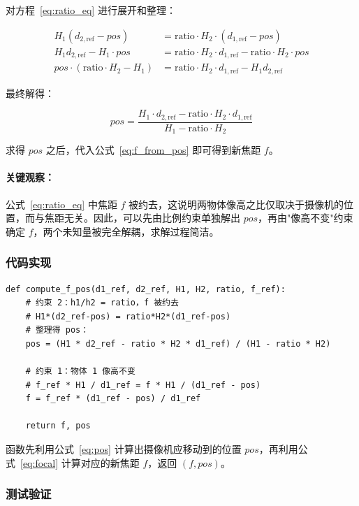 \documentclass[12pt,a4paper]{ctexart}
\begin{document}
对方程~\eqref{eq:ratio_eq} 进行展开和整理：

\begin{align}
  H_1 (d_{2,\text{ref}} - pos) &= \text{ratio} \cdot H_2 \cdot (d_{1,\text{ref}} - pos) \\
  H_1 d_{2,\text{ref}} - H_1 \cdot pos &= \text{ratio} \cdot H_2 \cdot d_{1,\text{ref}} - \text{ratio} \cdot H_2 \cdot pos \\
  pos \cdot (\text{ratio} \cdot H_2 - H_1) &= \text{ratio} \cdot H_2 \cdot d_{1,\text{ref}} - H_1 d_{2,\text{ref}}
\end{align}

最终解得：

\begin{equation}
  \boxed{pos = \frac{H_1 \cdot d_{2,\text{ref}} - \text{ratio} \cdot H_2 \cdot d_{1,\text{ref}}}{H_1 - \text{ratio} \cdot H_2}}
  \label{eq:pos}
\end{equation}

求得 $pos$ 之后，代入公式~\eqref{eq:f_from_pos} 即可得到新焦距 $f$。

\paragraph{关键观察：}公式~\eqref{eq:ratio_eq} 中焦距 $f$ 被约去，这说明两物体像高之比仅取决于摄像机的位置，而与焦距无关。因此，可以先由比例约束单独解出 $pos$，再由"像高不变"约束确定 $f$，两个未知量被完全解耦，求解过程简洁。

\subsubsection{代码实现}

\begin{lstlisting}
def compute_f_pos(d1_ref, d2_ref, H1, H2, ratio, f_ref):
    # 约束 2：h1/h2 = ratio，f 被约去
    # H1*(d2_ref-pos) = ratio*H2*(d1_ref-pos)
    # 整理得 pos：
    pos = (H1 * d2_ref - ratio * H2 * d1_ref) / (H1 - ratio * H2)

    # 约束 1：物体 1 像高不变
    # f_ref * H1 / d1_ref = f * H1 / (d1_ref - pos)
    f = f_ref * (d1_ref - pos) / d1_ref

    return f, pos
\end{lstlisting}

函数先利用公式~\eqref{eq:pos} 计算出摄像机应移动到的位置 $pos$，再利用公式~\eqref{eq:focal} 计算对应的新焦距 $f$，返回 $(f, pos)$。

\subsubsection{测试验证}
\end{document}
